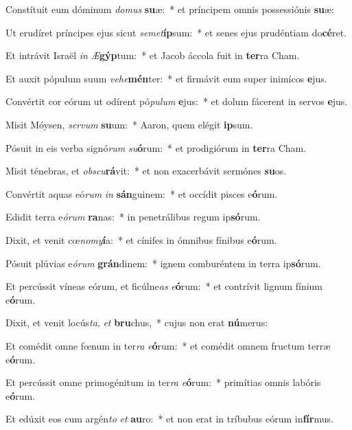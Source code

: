 \item Constítuit eum dóminum \textit{do}\textit{mus} \textbf{su}æ:~* et príncipem omnis possessiónis \textbf{su}æ:
\item Ut erudíret príncipes ejus sicut \textit{se}\textit{met}\textbf{íp}sum:~* et senes ejus prudéntiam do\textbf{cé}ret.
\item Et intrávit Israël \textit{in} \textit{Æ}\textbf{gýp}tum:~* et Jacob áccola fuit in \textbf{ter}ra Cham.
\item Et auxit pópulum suum \textit{ve}\textit{he}\textbf{mén}ter:~* et firmávit eum super inimícos \textbf{e}jus.
\item Convértit cor eórum ut odírent pó\textit{pu}\textit{lum} \textbf{e}jus:~* et dolum fácerent in servos \textbf{e}jus.
\item Misit Móysen, \textit{ser}\textit{vum} \textbf{su}um:~* Aaron, quem elégit \textbf{ip}sum.
\item Pósuit in eis verba signó\textit{rum} \textit{su}\textbf{ó}rum:~* et prodigiórum in \textbf{ter}ra Cham.
\item Misit ténebras, et \textit{obs}\textit{cu}\textbf{rá}vit:~* et non exacerbávit sermónes \textbf{su}os.
\item Convértit aquas eó\textit{rum} \textit{in} \textbf{sán}guinem:~* et occídit pisces e\textbf{ó}rum.
\item Edidit terra e\textit{ó}\textit{rum} \textbf{ra}nas:~* in penetrálibus regum ip\textbf{só}rum.
\item Dixit, et venit cœ\textit{no}\textit{my}\textbf{í}a:~* et cínifes in ómnibus fínibus e\textbf{ó}rum.
\item Pósuit plúvias e\textit{ó}\textit{rum} \textbf{grán}dinem:~* ignem comburéntem in terra ip\textbf{só}rum.
\item Et percússit víneas eórum, et ficúlne\textit{as} \textit{e}\textbf{ó}rum:~* et contrívit lignum fínium e\textbf{ó}rum.
\item Dixit, et venit locús\textit{ta}, \textit{et} \textbf{bru}chus,~* cujus non erat \textbf{nú}merus:
\item Et comédit omne fœnum in ter\textit{ra} \textit{e}\textbf{ó}rum:~* et comédit omnem fructum terræ e\textbf{ó}rum.
\item Et percússit omne primogénitum in ter\textit{ra} \textit{e}\textbf{ó}rum:~* primítias omnis labóris e\textbf{ó}rum.
\item Et edúxit eos cum argén\textit{to} \textit{et} \textbf{au}ro:~* et non erat in tríbubus eórum in\textbf{fír}mus.
